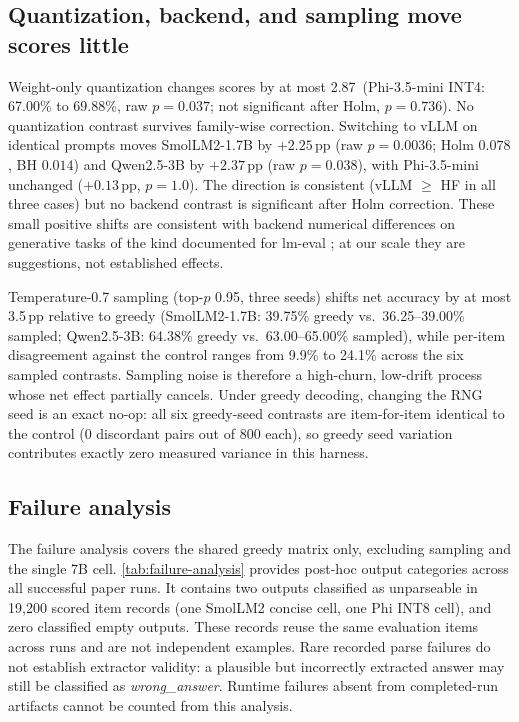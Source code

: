 
\subsection{Quantization, backend, and sampling move scores little}
\label{sec:sensitivity}

Weight-only quantization changes scores by at most 2.87\,\pp{}
(Phi-3.5-mini INT4: 67.00\% to 69.88\%, raw $p=0.037$; not significant
after Holm, $p=0.736$). No quantization contrast survives family-wise
correction. Switching to vLLM on identical prompts moves SmolLM2-1.7B
by $+2.25$\,pp{} (raw $p=0.0036$; Holm $0.078$, BH $0.014$) and
Qwen2.5-3B by $+2.37$\,pp{} (raw $p=0.038$), with Phi-3.5-mini
unchanged ($+0.13$\,pp{}, $p=1.0$). The direction is consistent
(vLLM $\ge$ HF in all three cases) but no backend contrast is
significant after Holm correction. These small positive shifts are
consistent with backend numerical differences on generative tasks of
the kind documented for lm-eval \citep{biderman2024lessons}; at our
scale they are suggestions, not established effects.

Temperature-0.7 sampling (top-$p$ 0.95, three seeds) shifts net
accuracy by at most 3.5\,pp relative to greedy (SmolLM2-1.7B: 39.75\%
greedy vs.\ 36.25--39.00\% sampled; Qwen2.5-3B: 64.38\% greedy vs.\
63.00--65.00\% sampled), while per-item disagreement against the
control ranges from 9.9\% to 24.1\% across the six sampled contrasts.
Sampling noise is therefore a high-churn, low-drift process whose net
effect partially cancels. Under greedy decoding, changing the RNG seed
is an exact no-op: all six greedy-seed contrasts are item-for-item
identical to the control (0 discordant pairs out of 800 each), so
greedy seed variation contributes exactly zero measured variance in
this harness.

\subsection{Failure analysis}
\label{sec:failures}

The failure analysis covers the shared greedy matrix only, excluding
sampling and the single 7B cell. \cref{tab:failure-analysis} provides
post-hoc output categories across all successful paper runs. It contains
two outputs classified as unparseable in 19{,}200 scored item records
(one SmolLM2 concise cell, one Phi INT8 cell), and zero classified empty
outputs. These records reuse the same evaluation items across runs and are
not independent examples. Rare recorded parse failures do not establish
extractor validity: a plausible but incorrectly extracted answer may still
be classified as \emph{wrong\_answer}. Runtime failures absent from
completed-run artifacts cannot be counted from this analysis.

